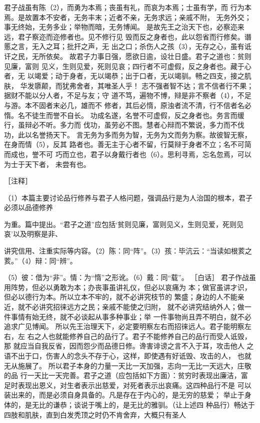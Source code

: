 \documentclass[12pt,UTF8]{ctexbook}
\begin{document}
君子战虽有陈（2），而勇为本焉；丧虽有礼，而哀为本焉；士虽有学，而 
行为本焉。是故置本不安者，无务丰末；近者不亲，无务求远；亲戚不附， 
无务外交；事无终始，无务多业；举物而暗，无务博闻。 
是故先王之治天下也，必察迩来远，君子察迩而迩修者也。见不修行见 
毁而反之身者也，此以怨省而行修矣。谮慝之言，无入之耳；批扞之声，无 
出之口；杀伤人之孩（3），无存之心，虽有诋讦之民，无所依矣。 
故君子力事日强，愿欲日逾，设壮日盛。君子之道也：贫则见廉，富则 
见义，生则见爱，死则见哀；四行者不可虚假，反之身者也。藏于心者，无 
以竭爱；动于身者，无以竭恭；出于口者，无以竭驯。畅之四支，接之肌肤， 
华发隳颠，而犹弗舍者，其唯圣人乎！ 
志不强者智不达；言不信者行不果；据财不能以分人者，不足与友；守 
道不笃，遍物不博，辩是非不察者（4），不足与游。本不固者末必几，雄而不 
修者，其后必惰，原浊者流不清，行不信者名必惰。名不徒生而誉不自长。 
功成名遂，名誉不可虚假，反之身者也。务言而缓行，虽辩必不听。多力而 
伐功，虽劳必不图。慧者心辩而不繁说，多力而不伐功，此以名誉扬天下。 
言无务为多而务为智，无务为文而务为察。故彼智无察，在身而情（5），反其 
路者也。善无主于心者不留，行莫辩于身者不立；名不可简而成也，誉不可 
巧而立也，君子以身戴行者也（6）。思利寻焉，忘名忽焉，可以为士于天下者， 
未尝有也。 


［注释］ 

（1）本篇主要讨论品行修养与君子人格问题，强调品行是为人治国的根本，君子必须以品德修养 

为重。篇中提出。“君子之道”应包括‘贫则见廉，富则见义，生则见爱，死则见哀’以及明察是非、 

讲究信用、注重实际等内容。（2）陈：同“阵”。（3）孩：毕沆云：“当读如根荄之荄。”（4）辩：同“辨”。 

（5）彼：借为“非”。情：为“惰”之形讹。（6）戴：同“载”。 
［白话］ 
君子作战虽用阵势，但必以勇敢为本；办丧事虽讲礼仪，但必以哀痛为 
本；做官虽讲才识，但必以德行为本。所以立本不牢的，就不必讲究枝节的 
繁盛；身边的人不能亲近，就不必讲究招徕远方之民；亲戚不能使之归附， 
就不必讲究结纳外人；做一件事情有始无终，就不必谈起从事多种事业；举 
一件事物尚且弄不明白，就不必追求广见博闻。 
所以先王治理天下，必定要明察左右而招徕远人。君子能明察左右，左 
右之人也就能修养自己的品行了。君子不能修养自己的品行而受人诋毁，那 
就应当自我反省，因而怨少而品德日修。谗害诽谤之言不入于耳，攻击他人 
之语不出于口，伤害人的念头不存于心，这样，即使遇有好诋毁、攻击的人， 
也就无从施展了。 
所以君子本身的力量一天比一天加强，志向一无比一天远大，庄敬的品 
行一天比一天完善。君子之道（应包括如下方面）：贫穷时表现出廉洁，富 
足时表现出恩义，对生者表示出慈爱，对死者表示出哀痛。这四种品行不是 
可以装出来的，而是必须自身具备的。凡是存在于内心的，是无穷的慈爱； 
举止于身体的，是无比的谦恭；谈说于嘴上的，是无比的雅驯。（让上述四 
种品行）畅达于四肢和肌肤，直到白发秃顶之时仍不肯舍弃，大概只有圣人 
\end{document}
